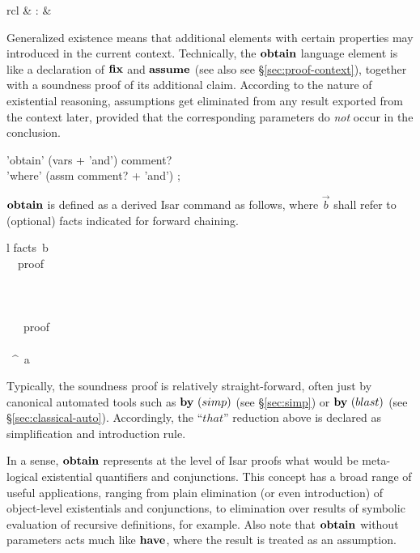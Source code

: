 \begin{matharray}{rcl}
   & : &  \\
\end{matharray}

Generalized existence means that additional elements with certain properties
may introduced in the current context.  Technically, the ${\mathord{\mathbf{obtain}}}$
language element is like a declaration of ${\mathord{\mathbf{fix}}}$ and ${\mathord{\mathbf{assume}}}$ (see
also see \S\ref{sec:proof-context}), together with a soundness proof of its
additional claim.  According to the nature of existential reasoning,
assumptions get eliminated from any result exported from the context later,
provided that the corresponding parameters do \emph{not} occur in the
conclusion.

\begin{rail}
  'obtain' (vars + 'and') comment? \\ 'where' (assm comment? + 'and')
  ;
\end{rail}

${\mathord{\mathbf{obtain}}}$ is defined as a derived Isar command as follows, where $\vec b$
shall refer to (optional) facts indicated for forward chaining.
\begin{matharray}{l}
  \langle facts~\vec b\rangle \\
  ~~\langle proof\rangle \equiv {} \\[1ex]
  \quad \BG \\
  \qquad {} \\
  \qquad {} \\
  \qquad {}~~~\langle proof\rangle \\
  \quad \EN \\
  \quad {}~\ASSUMENAME^\ast~a\colon~\vec\phi \\
\end{matharray}

Typically, the soundness proof is relatively straight-forward, often just by
canonical automated tools such as $\BY{simp}$ (see \S\ref{sec:simp}) or
$\BY{blast}$ (see \S\ref{sec:classical-auto}).  Accordingly, the ``$that$''
reduction above is declared as simplification and introduction rule.

\medskip

In a sense, ${\mathord{\mathbf{obtain}}}$ represents at the level of Isar proofs what would be
meta-logical existential quantifiers and conjunctions.  This concept has a
broad range of useful applications, ranging from plain elimination (or even
introduction) of object-level existentials and conjunctions, to elimination
over results of symbolic evaluation of recursive definitions, for example.
Also note that ${\mathord{\mathbf{obtain}}}$ without parameters acts much like ${\mathord{\mathbf{have}}}$,
where the result is treated as an assumption.


